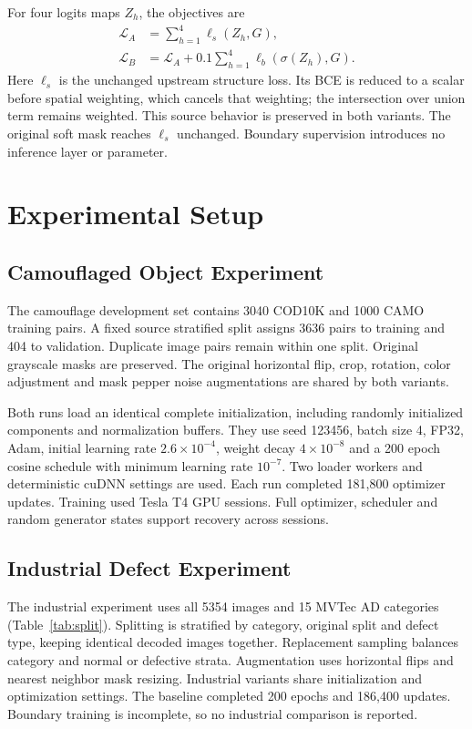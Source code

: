 \documentclass[conference,letterpaper]{IEEEtran}
\begin{document}
For four logits maps $Z_h$, the objectives are
\begin{equation}
\begin{aligned}
 \mathcal{L}_A&=\sum_{h=1}^{4}\ell_s(Z_h,G),\\
 \mathcal{L}_B&=\mathcal{L}_A+
           0.1\sum_{h=1}^{4}\ell_b(\sigma(Z_h),G).
\end{aligned}
\label{eq:objectives}
\end{equation}
Here $\ell_s$ is the unchanged upstream structure loss. Its BCE is reduced to a scalar before spatial weighting, which cancels that weighting; the intersection over union term remains weighted. This source behavior is preserved in both variants. The original soft mask reaches $\ell_s$ unchanged. Boundary supervision introduces no inference layer or parameter.

\section{Experimental Setup}
\subsection{Camouflaged Object Experiment}
The camouflage development set contains 3040 COD10K and 1000 CAMO training pairs. A fixed source stratified split assigns 3636 pairs to training and 404 to validation. Duplicate image pairs remain within one split. Original grayscale masks are preserved. The original horizontal flip, crop, rotation, color adjustment and mask pepper noise augmentations are shared by both variants.

Both runs load an identical complete initialization, including randomly initialized components and normalization buffers. They use seed 123456, batch size 4, FP32, Adam, initial learning rate $2.6\times10^{-4}$, weight decay $4\times10^{-8}$ and a 200 epoch cosine schedule with minimum learning rate $10^{-7}$. Two loader workers and deterministic cuDNN settings are used. Each run completed 181,800 optimizer updates. Training used Tesla T4 GPU sessions. Full optimizer, scheduler and random generator states support recovery across sessions.

\subsection{Industrial Defect Experiment}
The industrial experiment uses all 5354 images and 15 MVTec AD categories (Table~\ref{tab:split}). Splitting is stratified by category, original split and defect type, keeping identical decoded images together. Replacement sampling balances category and normal or defective strata. Augmentation uses horizontal flips and nearest neighbor mask resizing. Industrial variants share initialization and optimization settings. The baseline completed 200 epochs and 186,400 updates. Boundary training is incomplete, so no industrial comparison is reported.
\end{document}
